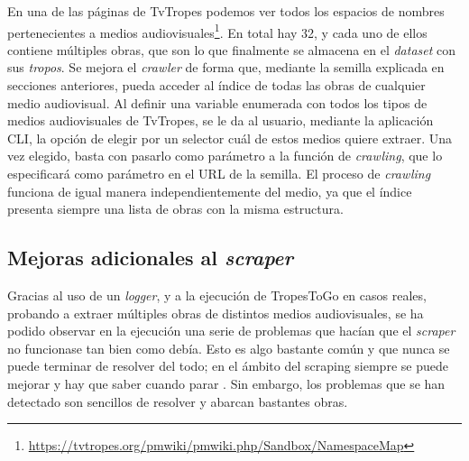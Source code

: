En una de las páginas de TvTropes podemos ver todos los espacios de nombres
pertenecientes a medios
audiovisuales\footnote{\url{https://tvtropes.org/pmwiki/pmwiki.php/Sandbox/NamespaceMap}}.
En total hay 32, y cada uno de ellos contiene múltiples obras, que son lo que
finalmente se almacena en el \textit{dataset} con sus \textit{tropos}. Se mejora
el \textit{crawler} de forma que, mediante la semilla explicada en secciones
anteriores, pueda acceder al índice de todas las obras de cualquier medio
audiovisual. Al definir una variable enumerada con todos los tipos de medios
audiovisuales de TvTropes, se le da al usuario, mediante la aplicación CLI, la
opción de elegir por un selector cuál de estos medios quiere extraer. Una vez
elegido, basta con pasarlo como parámetro a la función de \textit{crawling}, que
lo especificará como parámetro en el URL de la semilla. El proceso de
\textit{crawling} funciona de igual manera independientemente del medio, ya que
el índice presenta siempre una lista de obras con la misma estructura.

\subsection{Mejoras adicionales al \textit{scraper}}
Gracias al uso de un \textit{logger}, y a la ejecución de TropesToGo en casos
reales, probando a extraer múltiples obras de distintos medios audiovisuales, se
ha podido observar en la ejecución una serie de problemas que hacían que el
\textit{scraper} no funcionase tan bien como debía. Esto es algo bastante común
y que nunca se puede terminar de resolver del todo; en el ámbito del scraping
siempre se puede mejorar y hay que saber cuando parar \cite{nishalscraping}. Sin
embargo, los problemas que se han detectado son sencillos de resolver y abarcan
bastantes obras. 

